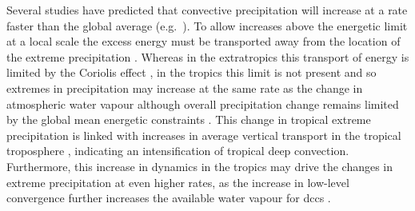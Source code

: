 Several studies have predicted that convective precipitation will increase at a rate faster than the global average (e.g.\ \citet{ogorman_physical_2009, muller_intensification_2011, ogorman_precipitation_2015, donat_more_2016}).
To allow increases above the energetic limit at a local scale the excess energy must be transported away from the location of the extreme precipitation \citep{muller_energetic_2011}.
Whereas in the extratropics this transport of energy is limited by the Coriolis effect \citep{ogorman_physical_2009}, in the tropics this limit is not present and so extremes in precipitation may increase at the same rate as the change in atmospheric water vapour \citep{ogorman_energetic_2012} although overall precipitation change remains limited by the global mean energetic constraints \citep{allen_constraints_2002}.
This change in tropical extreme precipitation is linked with increases in average vertical transport in the tropical troposphere \citep{muller_energetic_2011}, indicating an intensification of tropical deep convection.
Furthermore, this increase in dynamics in the tropics may drive the changes in extreme precipitation at even higher rates, as the increase in low-level convergence further increases the available water vapour for \acrshort{dcc}s \citep{ogorman_energetic_2012}.


